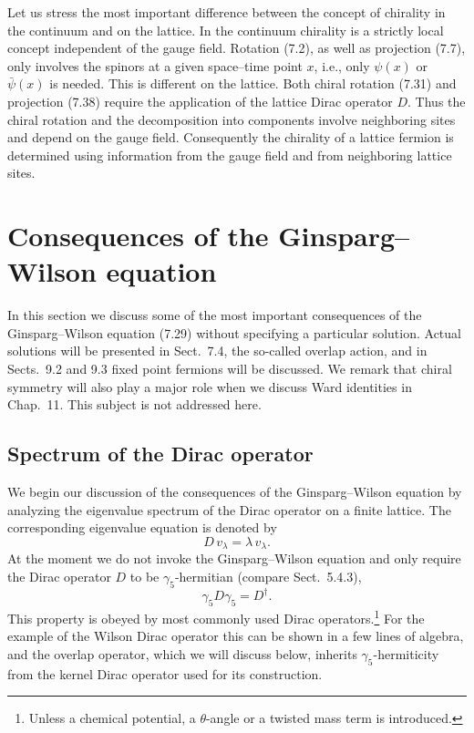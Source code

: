 Let us stress the most important difference between the concept of chirality
in the continuum and on the lattice. In the continuum chirality is a strictly
local concept independent of the gauge field. Rotation (7.2), as well as
projection (7.7), only involves the spinors at a given space--time point $x$,
i.e., only $\psi(x)$ or $\bar\psi(x)$ is needed. This is different on the
lattice. Both chiral rotation (7.31) and projection (7.38) require the
application of the lattice Dirac operator $D$. Thus the chiral rotation and
the decomposition into components involve neighboring sites and depend on the
gauge field. Consequently the chirality of a lattice fermion is determined
using information from the gauge field and from neighboring lattice sites.

\section{Consequences of the Ginsparg--Wilson equation}

In this section we discuss some of the most important consequences of the
Ginsparg--Wilson equation (7.29) without specifying a particular solution.
Actual solutions will be presented in Sect.~7.4, the so-called overlap action,
and in Sects.~9.2 and 9.3 fixed point fermions will be discussed. We remark
that chiral symmetry will also play a major role when we discuss Ward
identities in Chap.~11. This subject is not addressed here.

\subsection{Spectrum of the Dirac operator}

We begin our discussion of the consequences of the Ginsparg--Wilson equation
by analyzing the eigenvalue spectrum of the Dirac operator on a finite lattice.
The corresponding eigenvalue equation is denoted by
\begin{equation}
  D\,v_\lambda = \lambda\,v_\lambda .
\end{equation}
At the moment we do not invoke the Ginsparg--Wilson equation and only require
the Dirac operator $D$ to be $\gamma_5$-hermitian (compare Sect.~5.4.3),
\begin{equation}
  \gamma_5 D\gamma_5 = D^\dagger .
\end{equation}
This property is obeyed by most commonly used Dirac operators.\footnote{Unless
a chemical potential, a $\theta$-angle or a twisted mass term is introduced.}
For the example of the Wilson Dirac operator this can be shown in a few lines
of algebra, and the overlap operator, which we will discuss below, inherits
$\gamma_5$-hermiticity from the kernel Dirac operator used for its
construction.

